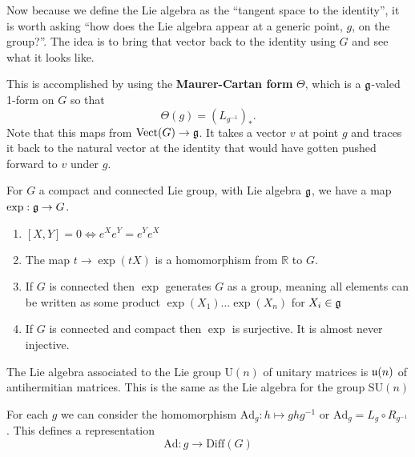 		
		Now because we define the Lie algebra as the ``tangent space to the identity'', it is worth asking ``how does the Lie algebra appear at a generic point, $g$, on the group?''. The idea is to bring that vector back to the identity using $G$ and see what it looks like. 
		
		This is accomplished by using the \textbf{Maurer-Cartan form} $\Theta$, which is a $\frak g$-valed 1-form on $G$ so that 
		\begin{equation}
			\Theta(g) = (L_{g^{-1}})_*.
		\end{equation}
		Note that this maps from $\mathrm{Vect}(G) \rightarrow \frak g$. It takes a vector $v$ at point $g$ and traces it back to the natural vector at the identity that would have gotten pushed forward to $v$ under $g$.
		
		\begin{prop}
			For $G$ a compact and connected Lie group, with Lie algebra $\frak g$, we have a map $\exp : \frak g \rightarrow G$.
			\begin{enumerate}
				\item $[X,Y] = 0 \Leftrightarrow e^X e^Y = e^Y e^X$
				\item The map $t \rightarrow \exp(t X)$ is a homomorphism from $\mathbb R$ to $G$.
				\item If $G$ is connected then $\exp$ generates $G$ as a group, meaning all elements can be written as some product $\exp(X_1) \dots \exp(X_n)$ for $X_i \in \frak g$
				\item If $G$ is connected and compact then $\exp$ is surjective. It is almost never injective.
			\end{enumerate}
		\end{prop}
		
		\begin{eg}
			The Lie algebra associated to the Lie group $\mathrm U(n)$ of unitary matrices is $\frak u(n)$ of antihermitian matrices. This is the same as the Lie algebra for the group $\mathrm{SU}(n)$
		\end{eg}
		
		\begin{defn}
			For each $g$ we can consider the homomorphism $\mathrm{Ad}_g: h \mapsto g h g^{-1}$ or $\mathrm{Ad}_g = L_g \circ R_{g^{-1}}$. This defines a representation
			\begin{equation}
				\mathrm{Ad}: g \rightarrow \mathrm{Diff}(G)
			\end{equation}
		\end{defn}
		
